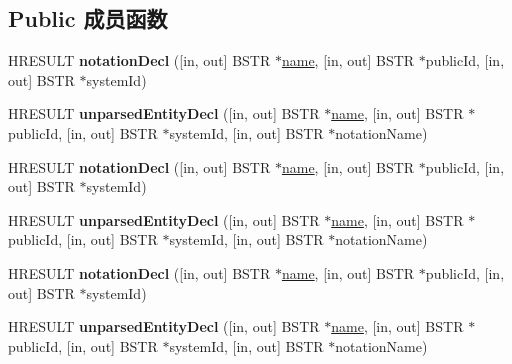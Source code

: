 \subsection*{Public 成员函数}
\begin{DoxyCompactItemize}
\item 
\mbox{\label{interface_m_s_x_m_l2_1_1_i_v_b_s_a_x_d_t_d_handler_a046c096c687dce2ccc9617bb077aa141}} 
H\+R\+E\+S\+U\+LT {\bfseries notation\+Decl} (\mbox{[}in, out\mbox{]} B\+S\+TR $\ast$\hyperlink{structname}{name}, \mbox{[}in, out\mbox{]} B\+S\+TR $\ast$public\+Id, \mbox{[}in, out\mbox{]} B\+S\+TR $\ast$system\+Id)
\item 
\mbox{\label{interface_m_s_x_m_l2_1_1_i_v_b_s_a_x_d_t_d_handler_a69d6f525eb6c2acc8524e8e30f3d586c}} 
H\+R\+E\+S\+U\+LT {\bfseries unparsed\+Entity\+Decl} (\mbox{[}in, out\mbox{]} B\+S\+TR $\ast$\hyperlink{structname}{name}, \mbox{[}in, out\mbox{]} B\+S\+TR $\ast$public\+Id, \mbox{[}in, out\mbox{]} B\+S\+TR $\ast$system\+Id, \mbox{[}in, out\mbox{]} B\+S\+TR $\ast$notation\+Name)
\item 
\mbox{\label{interface_m_s_x_m_l2_1_1_i_v_b_s_a_x_d_t_d_handler_a046c096c687dce2ccc9617bb077aa141}} 
H\+R\+E\+S\+U\+LT {\bfseries notation\+Decl} (\mbox{[}in, out\mbox{]} B\+S\+TR $\ast$\hyperlink{structname}{name}, \mbox{[}in, out\mbox{]} B\+S\+TR $\ast$public\+Id, \mbox{[}in, out\mbox{]} B\+S\+TR $\ast$system\+Id)
\item 
\mbox{\label{interface_m_s_x_m_l2_1_1_i_v_b_s_a_x_d_t_d_handler_a69d6f525eb6c2acc8524e8e30f3d586c}} 
H\+R\+E\+S\+U\+LT {\bfseries unparsed\+Entity\+Decl} (\mbox{[}in, out\mbox{]} B\+S\+TR $\ast$\hyperlink{structname}{name}, \mbox{[}in, out\mbox{]} B\+S\+TR $\ast$public\+Id, \mbox{[}in, out\mbox{]} B\+S\+TR $\ast$system\+Id, \mbox{[}in, out\mbox{]} B\+S\+TR $\ast$notation\+Name)
\item 
\mbox{\label{interface_m_s_x_m_l2_1_1_i_v_b_s_a_x_d_t_d_handler_a046c096c687dce2ccc9617bb077aa141}} 
H\+R\+E\+S\+U\+LT {\bfseries notation\+Decl} (\mbox{[}in, out\mbox{]} B\+S\+TR $\ast$\hyperlink{structname}{name}, \mbox{[}in, out\mbox{]} B\+S\+TR $\ast$public\+Id, \mbox{[}in, out\mbox{]} B\+S\+TR $\ast$system\+Id)
\item 
\mbox{\label{interface_m_s_x_m_l2_1_1_i_v_b_s_a_x_d_t_d_handler_a69d6f525eb6c2acc8524e8e30f3d586c}} 
H\+R\+E\+S\+U\+LT {\bfseries unparsed\+Entity\+Decl} (\mbox{[}in, out\mbox{]} B\+S\+TR $\ast$\hyperlink{structname}{name}, \mbox{[}in, out\mbox{]} B\+S\+TR $\ast$public\+Id, \mbox{[}in, out\mbox{]} B\+S\+TR $\ast$system\+Id, \mbox{[}in, out\mbox{]} B\+S\+TR $\ast$notation\+Name)
\end{DoxyCompactItemize}
